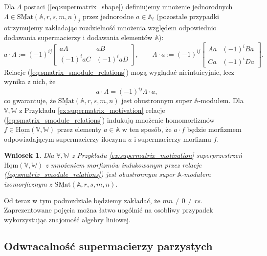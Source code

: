\documentclass[11pt,a4paper]{report}
\newtheorem{corollary}[theorem]{Wniosek}
\theoremstyle{definition}
\begin{document}
Dla $\Lambda$ postaci (\ref{eq:supermatrix_shape}) definiujemy mnożenie jednorodnych $\Lambda \in \underline{\mathrm{SMat}}(\mathbb{A},r,s,m,n)_j$ przez jednorodne $a \in \mathbb{A}_i$ (pozostałe przypadki otrzymujemy zakładając rozdzielność mnożenia względem odpowiednio dodawania supermacierzy i dodawania elementów $\mathbb{A}$):
\begin{equation}
\label{eq:smatrix_smodule_relations}
 a \cdot \Lambda := (-1)^{ij} \begin{bmatrix}
      aA & aB \\
      (-1)^{i} aC & (-1)^{i} aD
     \end{bmatrix}\!\!, \qquad
 \Lambda \cdot a := (-1)^{ij} \begin{bmatrix}
      Aa & (-1)^{i} Ba \\
      Ca & (-1)^{i} Da
     \end{bmatrix}\!\!.
\end{equation}
Relacje (\ref{eq:smatrix_smodule_relations}) mogą wyglądać nieintuicyjnie, lecz wynika z nich, że
\begin{equation*}
 a \cdot \Lambda = (-1)^{ij} \Lambda \cdot a,
\end{equation*}
co gwarantuje, że $\underline{\mathrm{SMat}}(\mathbb{A},r,s,m,n)$ jest obustronnym super $\mathbb{A}$-modułem. Dla $\mathbb{V}, \mathbb{W}$ z Przykładu \ref{ex:supermatrix_motivation} relacje (\ref{eq:smatrix_smodule_relations}) indukują mnożenie homomorfizmów $f \in \underline{\mathrm{Hom}}(\mathbb{V},\mathbb{W})$ przez elementy $a \in \mathbb{A}$ w ten sposób, że $a\cdot f$ będzie morfizmem odpowiadającym supermacierzy iloczynu $a$ i supermacierzy morfizmu $f$. 

\begin{corollary}
 Dla $\mathbb{V}, \mathbb{W}$ z Przykładu \ref{ex:supermatrix_motivation} superprzestrzeń $\underline{\mathrm{Hom}}(\mathbb{V},\mathbb{W})$ z mnożeniem morfizmów indukowanym przez relacje (\ref{eq:smatrix_smodule_relations}) jest obustronnym super $\mathbb{A}$-modułem izomorficznym z $\underline{\mathrm{SMat}}(\mathbb{A},r,s,m,n).$
\end{corollary}

Od teraz w tym podrozdziale będziemy zakładać, że $mn \neq 0 \neq rs$. Zaprezentowane pojęcia można łatwo uogólnić na osobliwy przypadek wykorzystując znajomość algebry liniowej.

\subsection{Odwracalność supermacierzy parzystych}
\end{document}
